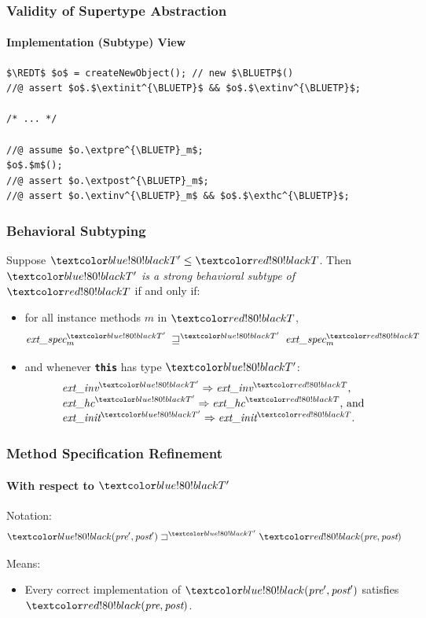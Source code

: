 
\begin{frame}[fragile]
\frametitle{Validity of Supertype Abstraction}
\framesubtitle{Implementation (Subtype) View}

\begin{lstlisting}[mathescape=true]
$\REDT$ $o$ = createNewObject(); // new $\BLUETP$()
//@ assert $o$.$\extinit^{\BLUETP}$ && $o$.$\extinv^{\BLUETP}$;

/* ... */

//@ assume $o.\extpre^{\BLUETP}_m$;
$o$.$m$();
//@ assert $o.\extpost^{\BLUETP}_m$;
//@ assert $o.\extinv^{\BLUETP}_m$ && $o$.$\exthc^{\BLUETP}$;
\end{lstlisting}
\end{frame}

\begin{frame}
\frametitle{Behavioral Subtyping}
\begin{definition}
Suppose $\BLUETP \STO \REDT$.  Then \\
$\BLUETP$ \emph{is a strong behavioral subtype of} $\REDT$
if and only if:

\begin{itemize}
\item
for all instance methods $m$ in $\REDT$,
\begin{displaymath}
\extspec^{\BLUETP}_m \:\sqsupseteq^{\BLUETP}\: \extspec^{\REDT}_m
\end{displaymath}

\item
and whenever \textbf{\texttt{this}} has type $\BLUETP$:
\begin{displaymath}
\begin{array}{l}
\extinv^{\BLUETP} \Rightarrow \extinv^{\REDT}, \\
\exthc^{\BLUETP} \Rightarrow \exthc^{\REDT}\mbox{, and}\\
\extinit^{\BLUETP} \Rightarrow \extinit^{\REDT}.
\end{array}
\end{displaymath}
\end{itemize}
\end{definition}
\end{frame}

\begin{frame}
\frametitle{Method Specification Refinement}
\framesubtitle{With respect to $\BLUETP$}

Notation:
\begin{displaymath}
\BLUE{(\pre',\post')} \sqsupset^{\BLUETP} \RED{(\pre,\post)}
\end{displaymath}

Means:
\begin{itemize}
\item
Every correct implementation of $\BLUE{(\pre',\post')}$ satisfies
$\RED{(\pre,\post)}$.
\end{itemize}
\end{frame}

